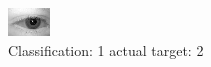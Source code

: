 \begin{figure}[h!]
\begin{center}
\includegraphics[width=0.60\columnwidth]{figures/ID489_class_1_target_2.png}
\end{center}
\caption{ Classification: 1 actual target: 2}
\label{fig:ID489_class_1_target_2}
\end{figure}
